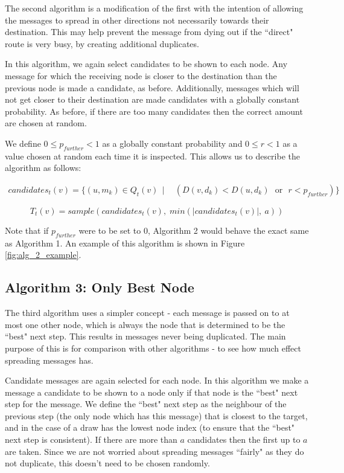\documentclass[bsc,frontabs,twoside,singlespacing,parskip,deptreport]{infthesis}     %
\begin{document}
The second algorithm is a modification of the first with the intention of allowing the messages to spread in other directions not necessarily towards their destination. This may help prevent the message from dying out if the ``direct" route is very busy, by creating additional duplicates.

In this algorithm, we again select candidates to be shown to each node. Any message for which the receiving node is closer to the destination than the previous node is made a candidate, as before. Additionally, messages which will not get closer to their destination are made candidates with a globally constant probability. As before, if there are too many candidates then the correct amount are chosen at random.

We define $0 \leq p_{further} < 1$ as a globally constant probability and $0 \leq r < 1$ as a value chosen at random each time it is inspected. This allows us to describe the algorithm as follows:

\begin{equation}
\begin{split}
candidates_{t}(v) = \{ (u, m_{k}) \in Q_{t}(v) \:\: | \:\: & (D(v, d_{k}) < D(u, d_{k}) \:\:\: \text{or} \:\:\: r < p_{further}) \}
\end{split}
\end{equation}

\begin{equation}
T_{t}(v) = \mathit{sample}(candidates_{t}(v), \; \mathit{min}(|candidates_{t}(v)|, \: a))
\end{equation}

Note that if $p_{further}$ were to be set to 0, Algorithm 2 would behave the exact same as Algorithm 1. An example of this algorithm is shown in Figure \ref{fig:alg_2_example}.

\subsection{Algorithm 3: Only Best Node}

The third algorithm uses a simpler concept - each message is passed on to at most one other node, which is always the node that is determined to be the ``best" next step. This results in messages never being duplicated. The main purpose of this is for comparison with other algorithms - to see how much effect spreading messages has.

Candidate messages are again selected for each node. In this algorithm we make a message a candidate to be shown to a node only if that node is the ``best" next step for the message. We define the ``best" next step as the neighbour of the previous step (the only node which has this message) that is closest to the target, and in the case of a draw has the lowest node index (to ensure that the ``best" next step is consistent). If there are more than $a$ candidates then the first up to $a$ are taken. Since we are not worried about spreading messages ``fairly" as they do not duplicate, this doesn't need to be chosen randomly. 
\end{document}
